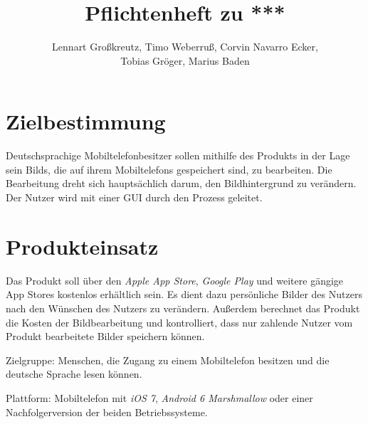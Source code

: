 \documentclass[parskip=full]{scrartcl}
\title{Pflichtenheft zu ***}
\author{Lennart Großkreutz, Timo Weberruß, Corvin Navarro Ecker, \\ Tobias Gröger, Marius Baden}
\begin{document}
\maketitle

%
%
\section{Zielbestimmung}
Deutschsprachige Mobiltelefonbesitzer sollen mithilfe des Produkts in der Lage sein \glspl{Bild}, die auf ihrem \glspl{Mobiltelefon} gespeichert sind, zu bearbeiten. Die Bearbeitung dreht sich hauptsächlich darum, den Bildhintergrund zu verändern. Der \gls{Nutzer} wird mit einer \gls{GUI} durch den Prozess geleitet.

\section{Produkteinsatz}
Das Produkt soll über den \textit{Apple App Store}, \textit{Google Play} und weitere gängige App Stores kostenlos erhältlich sein. Es dient dazu persönliche Bilder des \gls{Nutzer}s nach den Wünschen des Nutzers zu verändern. Außerdem berechnet das Produkt die Kosten der Bildbearbeitung und kontrolliert, dass nur zahlende Nutzer vom Produkt bearbeitete Bilder speichern können. 

Zielgruppe: Menschen, die Zugang zu einem Mobiltelefon besitzen und die deutsche Sprache lesen können.

Plattform: Mobiltelefon mit \textit{iOS 7}, \textit{Android 6 Marshmallow} oder einer Nachfolgerversion der beiden Betriebssysteme.
\end{document}
